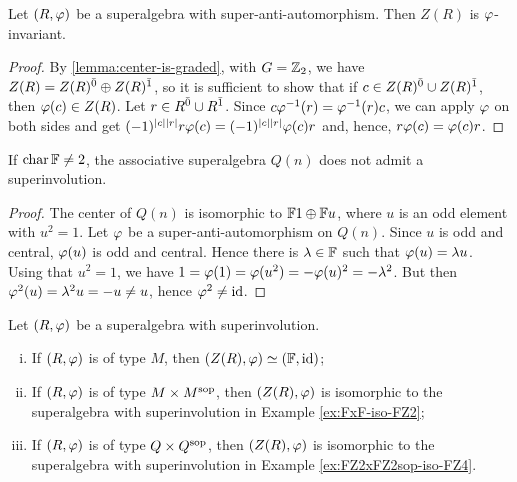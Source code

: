 \begin{lemma}
	Let $(R, \varphi)$ be a superalgebra with super-anti-automorphism.
	Then $Z(R)$ is $\varphi$-invariant.
\end{lemma}

\begin{proof}
	By \cref{lemma:center-is-graded}, with $G = \mathbb{Z}_2$, we have $Z(R) = Z(R)^{\bar0} \oplus Z(R)^{\bar1}$, so it is sufficient to show that if $c \in Z(R)^{\bar0} \cup Z(R)^{\bar1}$, then $\varphi(c) \in Z(R)$. 
	Let $r \in R^{\bar0} \cup R^{\bar1}$.
	Since $c\varphi^{-1} (r) = \varphi^{-1} (r)c$, we can apply $\varphi$ on both sides and get $(-1)^{|c||r|} r \varphi(c) = (-1)^{|c||r|} \varphi(c) r$ and, hence, $r \varphi(c) = \varphi(c) r$.
\end{proof}

\begin{cor}\label{cor:Q-no-spuerinv-center}
	If $\operatorname{char} \mathbb{F} \neq 2$, the associative superalgebra $Q(n)$ does not admit a superinvolution.
\end{cor}

\begin{proof}
	The center of $Q(n)$ is isomorphic to $\mathbb{F}1 \oplus \mathbb{F} u$, where $u$ is an odd element with $u^2 = 1$.
	Let $\varphi$ be a super-anti-automorphism on $Q(n)$.
	Since $u$ is odd and central, $\varphi(u)$ is odd and central.
	Hence there is $\lambda \in \mathbb{F}$ such that $\varphi(u) = \lambda u$.
	Using that $u^2 = 1$, we have $1 = \varphi(1) = \varphi(u^2) = - \varphi(u)^2 = - \lambda^2$.
	But then $\varphi^2 (u) = \lambda^2 u = -u \neq u$, hence $\varphi^2 \neq \operatorname{id}$.
\end{proof}


\begin{prop}\label{prop:types-of-SA-via-center}
	Let $(R, \varphi)$ be a superalgebra with superinvolution.
	\begin{enumerate}[(i)]
		\item If $(R, \varphi)$ is of type $M$, then $(Z(R), \varphi) \simeq (\mathbb{F}, \operatorname{id})$;\label{item:F-id}
		\item If $(R, \varphi)$ is of type $M\times M^{\mathrm{sop}}$, then $(Z(R), \varphi)$ is isomorphic to the superalgebra with superinvolution in Example \ref{ex:FxF-iso-FZ2};\label{item:FZ2-exchg}
		\item If $(R, \varphi)$ is of type $Q\times Q^{\mathrm{sop}}$, then $(Z(R), \varphi)$ is isomorphic to the superalgebra with superinvolution in Example \ref{ex:FZ2xFZ2sop-iso-FZ4}.\label{item:FZ4-exchg}
	\end{enumerate}
\end{prop}


